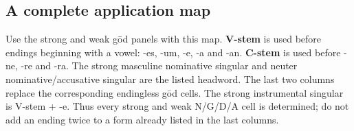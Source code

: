 \subsection*{A complete application map}

Use the strong and weak gōd panels with this map. \textbf{V-stem} is used before endings beginning with a vowel: -es, -um, -e, -a and -an. \textbf{C-stem} is used before -ne, -re and -ra. The strong masculine nominative singular and neuter nominative/\allowbreak{}accusative singular are the listed headword. The last two columns replace the corresponding endingless gōd cells. The strong instrumental singular is V-stem + -e. Thus every strong and weak N/\allowbreak{}G/\allowbreak{}D/\allowbreak{}A cell is determined; do not add an ending twice to a form already listed in the last columns.

